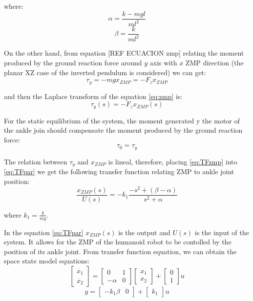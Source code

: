 where:
\begin{equation}
\alpha = \frac{k-mgl}{ml^2}
\end{equation}
\begin{equation}
\beta = \frac{k}{ml^2}
\end{equation}

On the other hand, from equation [REF ECUACION zmp] relating the moment produced by the ground reaction force around $y$ axis with $x$ ZMP direction (the planar XZ case of the inverted pendulum is considered) we can get:
\begin{equation}
\tau_y = -mgx_{ZMP} = - F_z x_{ZMP}
\label{eq:zmp}
\end{equation} 

and then the Laplace transform of the equation \ref{eq:zmp} is:
\begin{equation}
\tau_y(s) = - F_z x_{ZMP}(s)
\label{eq:TFzmp}
\end{equation}

For the static equilibrium of the system, the moment generated y the motor of the ankle join should compensate the moment produced by the ground reaction force:
\begin{equation}
\tau_0 = \tau_y
\end{equation}

The relation between $\tau_y$ and $x_{ZMP}$ is lineal, therefore, placing \ref{eq:TFzmp} into \ref{eq:TFpar} we get the following transfer function relating ZMP to ankle joint position: 
\begin{equation}
\frac{x_{ZMP}(s)}{U(s)} = - k_1 \frac{-s^2+(\beta - \alpha)}{s^2 + \alpha}
\end{equation}

where $k_1 = \frac{k}{mg}$.

In the equation \ref{eq:TFpar} $x_{ZMP}(s)$ is the output and $U(s)$ is the input of the system. It allows for the ZMP of the humanoid robot to be contolled by the position of its ankle joint. From transfer function equation, we can obtain the space state model equations:
\begin{equation}
\begin{bmatrix}
\dot{x_1} \\
\dot{x_2}
\end{bmatrix} 
= 
\begin{bmatrix}
0 & 1 \\
-\alpha & 0
\end{bmatrix}
\begin{bmatrix}
x_1 \\
x_2
\end{bmatrix}
+
\begin{bmatrix}
0 \\
1
\end{bmatrix}
u
\end{equation}
\begin{equation}
y = \begin{bmatrix}
-k_1\beta & 0 
\end{bmatrix}
+ \begin{bmatrix}
k_1
\end{bmatrix}
u
\end{equation}

